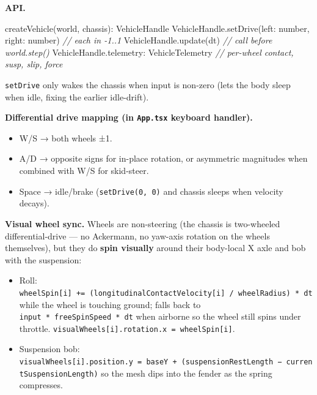 \documentclass[
]{article}
\newenvironment{Shaded}{}{}
\newcommand{\AttributeTok}[1]{\textcolor[rgb]{0.49,0.56,0.16}{#1}}
\newcommand{\CommentTok}[1]{\textcolor[rgb]{0.38,0.63,0.69}{\textit{#1}}}
\newcommand{\DataTypeTok}[1]{\textcolor[rgb]{0.56,0.13,0.00}{#1}}
\newcommand{\FunctionTok}[1]{\textcolor[rgb]{0.02,0.16,0.49}{#1}}
\newcommand{\NormalTok}[1]{#1}
\newcommand{\OperatorTok}[1]{\textcolor[rgb]{0.40,0.40,0.40}{#1}}
\providecommand{\tightlist}{%
  \setlength{\itemsep}{0pt}\setlength{\parskip}{0pt}}
\begin{document}
\textbf{API.}

\begin{Shaded}
\begin{Highlighting}[]
\FunctionTok{createVehicle}\NormalTok{(world}\OperatorTok{,}\NormalTok{ chassis)}\OperatorTok{:}\NormalTok{ VehicleHandle}
\NormalTok{VehicleHandle}\OperatorTok{.}\FunctionTok{setDrive}\NormalTok{(left}\OperatorTok{:} \DataTypeTok{number}\OperatorTok{,}\NormalTok{ right}\OperatorTok{:} \DataTypeTok{number}\NormalTok{)  }\CommentTok{// each in {-}1..1}
\NormalTok{VehicleHandle}\OperatorTok{.}\FunctionTok{update}\NormalTok{(dt)                             }\CommentTok{// call before world.step()}
\NormalTok{VehicleHandle}\OperatorTok{.}\AttributeTok{telemetry}\OperatorTok{:}\NormalTok{ VehicleTelemetry            }\CommentTok{// per{-}wheel contact, susp, slip, force}
\end{Highlighting}
\end{Shaded}

\texttt{setDrive} only wakes the chassis when input is non-zero (lets
the body sleep when idle, fixing the earlier idle-drift).

\textbf{Differential drive mapping (in \texttt{App.tsx} keyboard
handler).}

\begin{itemize}
\tightlist
\item
  W/S → both wheels ±1.
\item
  A/D → opposite signs for in-place rotation, or asymmetric magnitudes
  when combined with W/S for skid-steer.
\item
  Space → idle/brake (\texttt{setDrive(0,\ 0)} and chassis sleeps when
  velocity decays).
\end{itemize}

\textbf{Visual wheel sync.} Wheels are non-steering (the chassis is
two-wheeled differential-drive --- no Ackermann, no yaw-axis rotation on
the wheels themselves), but they do \textbf{spin visually} around their
body-local X axle and bob with the suspension:

\begin{itemize}
\tightlist
\item
  Roll:
  \texttt{wheelSpin{[}i{]}\ +=\ (longitudinalContactVelocity{[}i{]}\ /\ wheelRadius)\ *\ dt}
  while the wheel is touching ground; falls back to
  \texttt{input\ *\ freeSpinSpeed\ *\ dt} when airborne so the wheel
  still spins under throttle.
  \texttt{visualWheels{[}i{]}.rotation.x\ =\ wheelSpin{[}i{]}}.
\item
  Suspension bob:
  \texttt{visualWheels{[}i{]}.position.y\ =\ baseY\ +\ (suspensionRestLength\ −\ currentSuspensionLength)}
  so the mesh dips into the fender as the spring compresses.
\end{itemize}
\end{document}
